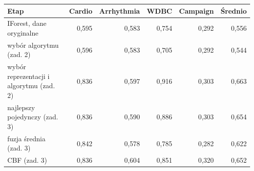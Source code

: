 \begin{tabular}{lrrrrr}
\toprule
Etap & Cardio & Arrhythmia & WDBC & Campaign & Średnio \\
\midrule
IForest, dane oryginalne & 0,595 & 0,583 & 0,754 & 0,292 & 0,556 \\
wybór algorytmu (zad. 2) & 0,596 & 0,583 & 0,705 & 0,292 & 0,544 \\
wybór reprezentacji i algorytmu (zad. 2) & 0,836 & 0,597 & 0,916 & 0,303 & 0,663 \\
najlepszy pojedynczy (zad. 3) & 0,836 & 0,590 & 0,886 & 0,303 & 0,654 \\
fuzja średnia (zad. 3) & 0,842 & 0,578 & 0,785 & 0,282 & 0,622 \\
CBF (zad. 3) & 0,836 & 0,604 & 0,851 & 0,320 & 0,652 \\
\bottomrule
\end{tabular}
